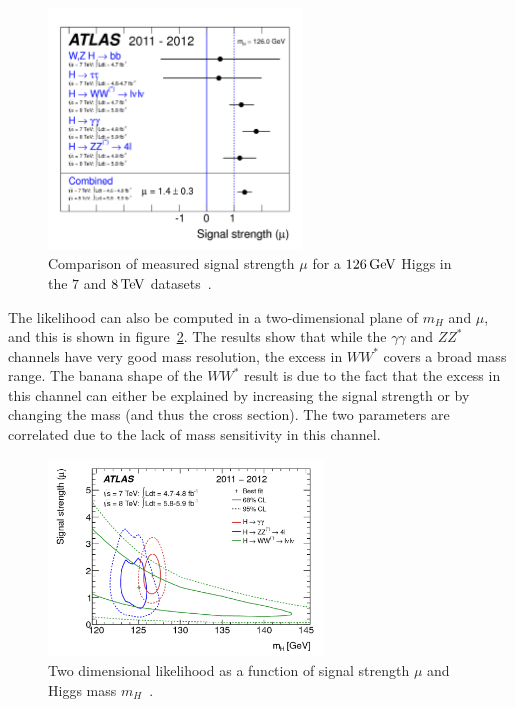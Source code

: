 \begin{figure}[h!]
  \centering
  \captionsetup{justification=centering}
  \includegraphics[width=0.6\textwidth]{figures/discovery_mu}
  \caption{Comparison of measured signal strength $\mu$ for a $126 \GeV$ Higgs in the $7$ and $8 \TeV$ datasets~\cite{Discovery}.}
  \label{fig:discovery_mu}
\end{figure}

The likelihood can also be computed in a two-dimensional plane of $m_{H}$ and $\mu$, and this is shown in figure~\ref{fig:disc_2d}. The results show that while the $\gamma\gamma$ and $ZZ^*$ channels have very good mass resolution, the excess in $WW^*$ covers a broad mass range. The banana shape of the $WW^*$ result is due to the fact that the excess in this channel can either be explained by increasing the signal strength or by changing the mass (and thus the cross section). The two parameters are correlated due to the lack of mass sensitivity in this channel. 

\begin{figure}[h!]
  \centering
  \captionsetup{justification=centering}
  \includegraphics[width=0.65\textwidth]{figures/disc_2d}
  \caption{Two dimensional likelihood as a function of signal strength $\mu$ and Higgs mass $m_H$~\cite{Discovery}.}
  \label{fig:disc_2d}
\end{figure}

